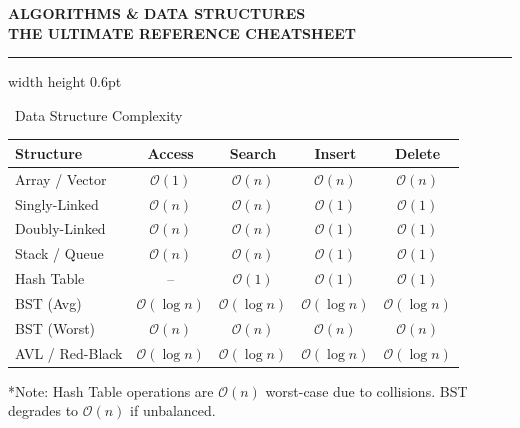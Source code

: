 \documentclass[10pt,landscape,letterpaper]{article}
\begin{document}
\begin{multicols*}{3}

\begin{center}
  \sffamily
  {\fontsize{18}{22}\bfseries\color{secondary} ALGORITHMS \& DATA STRUCTURES} \\[2pt]
  {\fontsize{9}{11}\bfseries\color{primary} THE ULTIMATE REFERENCE CHEATSHEET} \\[1pt]
  \hrule width \linewidth height 0.6pt
\end{center}
\vspace{2pt}

\begin{accentbox}{\faTable~Data Structure Complexity}
  \scriptsize
  \renewcommand{\arraystretch}{1.2}
  \begin{tabularx}{\linewidth}{@{} l *{4}{C} @{}}
    \toprule
    \textbf{Structure} & \textbf{Access} & \textbf{Search} & \textbf{Insert} & \textbf{Delete} \\
    \midrule
    Array / Vector & $\mathcal{O}(1)$ & $\mathcal{O}(n)$ & $\mathcal{O}(n)$ & $\mathcal{O}(n)$ \\
    Singly-Linked & $\mathcal{O}(n)$ & $\mathcal{O}(n)$ & $\mathcal{O}(1)$ & $\mathcal{O}(1)$ \\
    Doubly-Linked & $\mathcal{O}(n)$ & $\mathcal{O}(n)$ & $\mathcal{O}(1)$ & $\mathcal{O}(1)$ \\
    Stack / Queue & $\mathcal{O}(n)$ & $\mathcal{O}(n)$ & $\mathcal{O}(1)$ & $\mathcal{O}(1)$ \\
    Hash Table & -- & $\mathcal{O}(1)$ & $\mathcal{O}(1)$ & $\mathcal{O}(1)$ \\
    BST (Avg) & $\mathcal{O}(\log n)$ & $\mathcal{O}(\log n)$ & $\mathcal{O}(\log n)$ & $\mathcal{O}(\log n)$ \\
    BST (Worst) & $\mathcal{O}(n)$ & $\mathcal{O}(n)$ & $\mathcal{O}(n)$ & $\mathcal{O}(n)$ \\
    AVL / Red-Black & $\mathcal{O}(\log n)$ & $\mathcal{O}(\log n)$ & $\mathcal{O}(\log n)$ & $\mathcal{O}(\log n)$ \\
    \bottomrule
  \end{tabularx}
  \vspace{3pt}
  \tiny\color{gray}*Note: Hash Table operations are $\mathcal{O}(n)$ worst-case due to collisions. BST degrades to $\mathcal{O}(n)$ if unbalanced.
\end{accentbox}


\end{multicols*}
\end{document}
